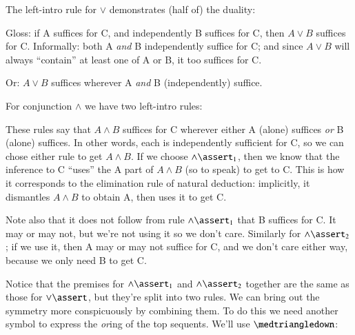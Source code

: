 \documentclass{article}
\begin{document}
The left-intro rule for \(\lor\) demonstrates (half of) the duality:


Gloss: if A suffices for C, and independently B suffices for C,
then \(A\lor B\) suffices for C. Informally: both A \textit{and} B
independently suffice for C; and since \(A\lor B\) will always
``contain'' at least one of A or B, it too suffices for C.

Or: \(A\lor B\) suffices wherever A \textit{and} B (independently)
suffice.

For conjunction \(\land\) we have two left-intro rules:


These rules say that \(A\land B\) suffices for C wherever either A
(alone) suffices \textit{or} B (alone) suffices. In other words, each
is independently sufficient for C, so we can chose either rule to get
\(A\land B\). If we choose \(\land\linfer_1\), then we know that the
inference to C ``uses'' the A part of \(A\land B\) (so to speak) to
get to C. This is how it corresponds to the elimination rule of
natural deduction: implicitly, it dismantles \(A\land B\) to obtain A,
then uses it to get C.

Note also that it does not follow from rule \(\land\linfer_1\) that B
suffices for C. It may or may not, but we're not using it so we don't
care. Similarly for \(\land\linfer_2\); if we use it, then A may or may
not suffice for C, and we don't care either way, because we only need
B to get C.

Notice that the premises for \(\land\linfer_1\) and \(\land\linfer_2\)
together are the same as those for \(\lor\linfer\), but they're split
into two rules. We can bring out the symmetry more conspicuously by
combining them. To do this we need another symbol to express the
\textit{or}ing of the top sequents. We'll use \(\medtriangledown\):
\end{document}
